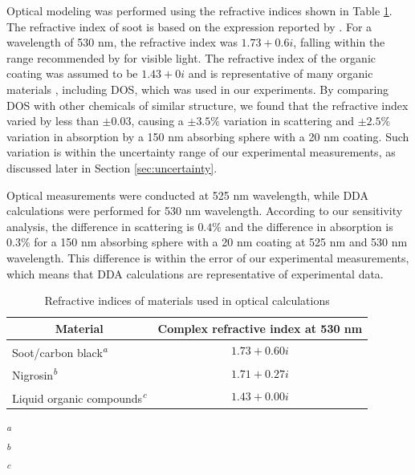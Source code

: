 Optical modeling was performed using the refractive indices shown in Table \ref{tab:refindices}. The refractive index of soot is based on the expression reported by \citet{RN23}. For a wavelength of 530 nm, the refractive index was $1.73+0.6i$, falling within the range recommended by \citet{RN34} for visible light. The refractive index of the organic coating was assumed to be $1.43+0i$ and is representative of many organic materials \citep{crchandbook}, including DOS, which was used in our experiments. By comparing DOS with other chemicals of similar structure, we found that the refractive index varied by less than  $\pm0.03$, causing a $\pm 3.5\%$ variation in scattering and $\pm 2.5\%$ variation in absorption by a 150 nm absorbing sphere with a 20 nm coating. Such variation is within the uncertainty range of our experimental measurements, as discussed later in Section \ref{sec:uncertainty}.

Optical measurements were conducted at 525 nm wavelength, while DDA calculations were performed for 530 nm wavelength. According to our sensitivity analysis, the difference in scattering is $0.4 \%$ and the difference in absorption is $0.3 \%$ for a 150 nm absorbing sphere with a 20 nm coating at 525 nm and 530 nm wavelength. This difference is within the error of our experimental measurements, which means that DDA calculations are representative of experimental data.

\begin{table}[ht]
\caption{Refractive indices of materials used in optical calculations}
\label{tab:refindices}
\begin{center}
\begin{tabular}{l c}
 \hline
 \multicolumn{1}{c}{Material} & Complex refractive index at 530 nm \\
 \hline
 Soot/carbon black\textsuperscript{\textit{a}} & $1.73+0.60i$\\
 Nigrosin\textsuperscript{\textit{b}} & $1.71+0.27i$\\
 Liquid organic compounds\textsuperscript{\textit{c}} & $1.43+0.00i$\\
 \hline
\end{tabular}
\end{center}

\textsuperscript{\textit{a}}\citet{RN23}\\
\textsuperscript{\textit{b}}\citet{RN15}\\
\textsuperscript{\textit{c}}\citet{RN22}
\end{table}

